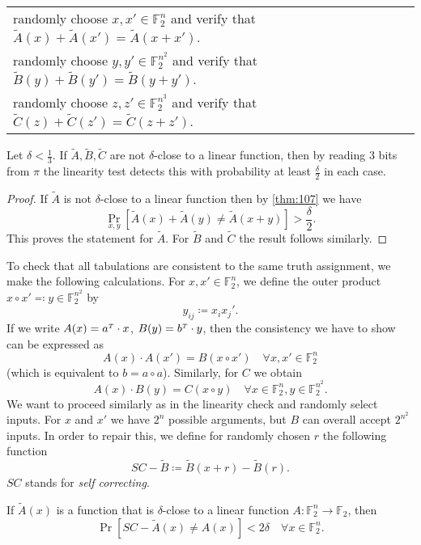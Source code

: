 \documentclass[../skript.tex]{subfiles}
\begin{document}
\begin{problem}
\begin{tabular}{@{}l}
randomly choose $x, x' \in \mathbb{F}_2^n$ and verify that $\tilde{A}(x) + \tilde{A}(x') = \tilde{A}(x + x')$. \\
randomly choose $y, y' \in \mathbb{F}_2^{n^2}$ and verify that $\tilde{B}(y) + \tilde{B}(y') = \tilde{B}(y + y')$. \\
randomly choose $z, z' \in \mathbb{F}_2^{n^3}$ and verify that $\tilde{C}(z) + \tilde{C}(z') = \tilde{C}(z + z')$.
\end{tabular}
\end{problem}
\begin{corollary} %
\label{thm:108}
Let $\delta < \frac{1}{3}$. If $\tilde{A}, \tilde{B}, \tilde{C}$ are not $\delta$-close to a linear function, then by reading 3 bits from $\pi$ the linearity test detects this with probability at least $\frac{\delta}{2}$ in each case.
\end{corollary}
\begin{proof}
If $\tilde{A}$ is not $\delta$-close to a linear function then by \cref{thm:107} we have
\[
\Pr_{x, y} \left[ \tilde{A}(x) + \tilde{A}(y) \neq \tilde{A}(x + y) \right] > \frac{\delta}{2}.
\]
This proves the statement for $\tilde{A}$. For $\tilde{B}$ and $\tilde{C}$ the result follows similarly.
\end{proof}
To check that all tabulations are consistent to the same truth assignment, we make the following calculations.
For $x, x' \in \mathbb{F}_2^n$, we define the outer product $x \circ x' \eqqcolon y \in \mathbb{F}_2^{n^2}$ by
\[
	y_{ij} \coloneqq x_i x_j'.
\]
If we write $A(x) = a^\tp \cdot x$, $B(y) = b^\tp \cdot y$, then the consistency we have to show can be expressed as
\[
	A(x) \cdot A(x') = B(x \circ x') \quad \forall x, x' \in \mathbb{F}_2^n
\]
(which is equivalent to $b = a \circ a$).
Similarly, for $C$ we obtain
\[
	A(x) \cdot B(y) = C(x \circ y) \quad \forall x\in \mathbb{F}_2^n, y \in \mathbb{F}_2^{n^2}.
\]
We want to proceed similarly as in the linearity check and randomly select inputs.
For $x$ and $x'$ we have $2^n$ possible arguments, but $B$ can overall accept $2^{n^2}$ inputs.
In order to repair this, we define for randomly chosen $r$ the following function
\[
	SC - \tilde{B} \coloneqq \tilde{B}(x + r) - \tilde{B}(r).
\]
$SC$ stands for \emph{self correcting}.
\begin{proposition} %
\label{thm:109}
If $\tilde{A}(x)$ is a function that is $\delta$-close to a linear function $A : \mathbb{F}_2^n \to \mathbb{F}_2$, then
\[
	\Pr \left[ SC - \tilde{A}(x) \neq A(x) \right] < 2 \delta \quad \forall x \in \mathbb{F}_2^n.
\]
\end{proposition}
\end{document}
